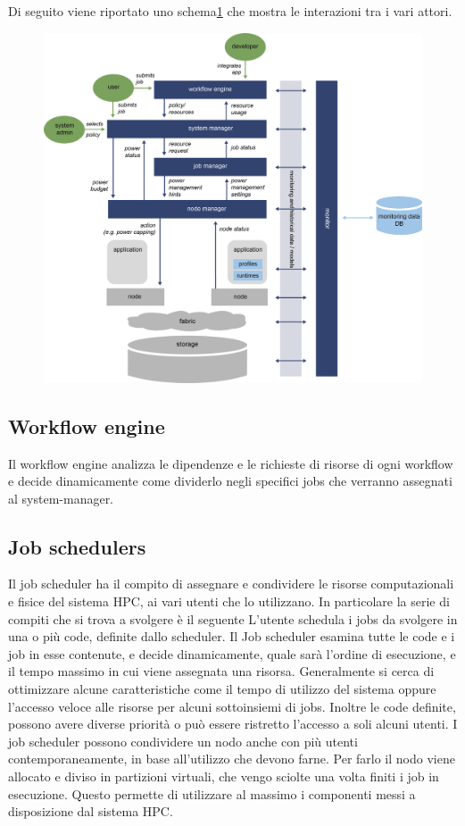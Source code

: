 Di seguito viene riportato uno schema\ref{fig:powerstackscheme} che mostra le interazioni tra i vari attori.
\begin{figure}[H]
    \centering
    \includegraphics[width=\textwidth]{img/REGALE-Architecture-1536x1421.png} 
    \label{fig:powerstackscheme}
\end{figure}
\subsection{Workflow engine}
Il workflow engine analizza le dipendenze e le richieste di risorse di ogni workflow e decide dinamicamente come dividerlo negli specifici jobs che verranno assegnati al system-manager.

\subsection{Job schedulers}
Il job scheduler ha il compito di assegnare e condividere le risorse computazionali e fisice del sistema HPC, ai vari utenti che lo utilizzano. In particolare la serie di compiti che si trova a svolgere è il seguente L'utente schedula i jobs da svolgere in una o più code, definite dallo scheduler. Il Job scheduler esamina tutte le code e i job in esse contenute, e decide dinamicamente, quale sarà l'ordine di esecuzione, e il tempo massimo in cui viene assegnata una risorsa. Generalmente si cerca di ottimizzare alcune caratteristiche come il tempo di utilizzo del sistema oppure l'accesso veloce alle risorse per alcuni sottoinsiemi di jobs. Inoltre le code definite, possono avere diverse priorità o può essere ristretto l'accesso a soli alcuni utenti. I job scheduler possono condividere un nodo anche con più utenti contemporaneamente, in base all'utilizzo che devono farne. Per farlo il nodo viene allocato e diviso in partizioni virtuali, che vengo sciolte una volta finiti i job in esecuzione. Questo permette di utilizzare al massimo i componenti messi a disposizione dal sistema HPC.

